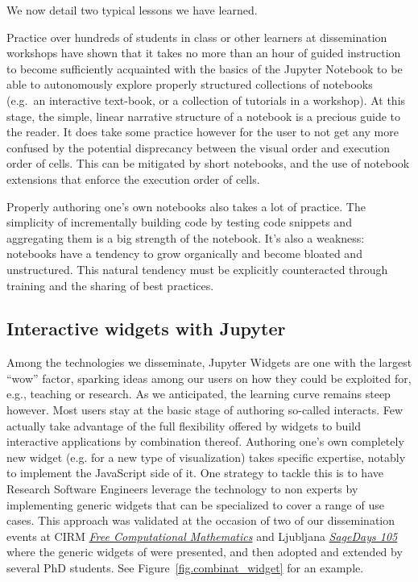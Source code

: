 \documentclass{deliverablereport}
\begin{document}
We now detail two typical lessons we have learned.

Practice over hundreds of students in class or other learners at
dissemination workshops have shown that it takes no more than an hour of
guided instruction to become sufficiently acquainted with the basics of
the Jupyter Notebook to be able to autonomously explore properly
structured collections of notebooks (e.g.~an interactive text-book, or a
collection of tutorials in a workshop). At this stage, the simple,
linear narrative structure of a notebook is a precious guide to the
reader.
It does take some practice however for the user to not get any more
confused by the potential disprecancy between the visual order and
execution order of cells. This can be mitigated by short notebooks, and
the use of notebook extensions that enforce the execution order of
cells.

Properly authoring one's own notebooks also takes a lot of practice.
The simplicity of incrementally building code by testing code snippets
and aggregating them is a big strength of the notebook. It's also a
weakness: notebooks have a tendency to grow organically and become
bloated and unstructured. This natural tendency must be explicitly
counteracted through training and the sharing of best practices.

\subsection{Interactive widgets with Jupyter}

Among the technologies we disseminate, Jupyter Widgets are one with
the largest ``wow'' factor, sparking ideas among our users on how they
could be exploited for, e.g., teaching or research. As we anticipated,
the learning curve remains steep however. Most users stay at the basic
stage of authoring so-called interacts. Few actually take advantage of
the full flexibility offered by widgets to build interactive
applications by combination thereof. Authoring one's own completely
new widget (e.g. for a new type of visualization) takes specific
expertise, notably to implement the JavaScript side of it. One
strategy to tackle this is to have Research Software Engineers leverage
the technology to non experts by implementing generic widgets that can
be specialized to cover a range of use cases. This approach was
validated at the occasion of two of our dissemination events at CIRM
\href{https://conferences.cirm-math.fr/1978.html}{\emph{Free
Computational Mathematics}} and Ljubljana
\href{https://wiki.sagemath.org/fpsac19}{\emph{SageDays 105}} where
the generic widgets of 
were presented, and then adopted and extended by several PhD students.
See Figure~\ref{fig.combinat_widget} for an example.
\end{document}
